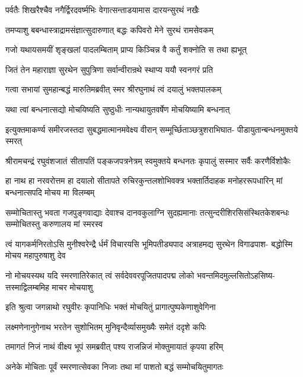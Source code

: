 \twolineshloka
{पर्वतैः शिखरैश्चैव नगैर्द्विरदवर्ष्मभिः}
{वेगात्सन्ताडयामास दारयन्सुरथं नखैः}%

\twolineshloka
{तमप्याशु बबन्धास्त्राद्रामसंज्ञात्सुदारुणात्}
{बद्धः कपिवरो मेने सुरथं रामसेवकम्}%

\twolineshloka
{गजो यथायसमयीं शृङ्खलां पादलम्बिताम्}
{प्राप्य किञ्चिन्न वै कर्तुं शक्नोति स तथा ह्यभूत्}%

\twolineshloka
{जितं तेन महाराज्ञा सुरथेन सुपुत्रिणा}
{सर्वान्वीरान्रथे स्थाप्य ययौ स्वनगरं प्रति}%

\twolineshloka
{गत्वा सभायां सुमहान्बद्धं मारुतिमब्रवीत्}
{स्मर श्रीरघुनाथं त्वं दयालुं भक्तपालकम्}%

\twolineshloka
{यथा त्वां बन्धनात्सद्यो मोचयिष्यति सुष्ठुधीः}
{नान्यथायुतवर्षेण मोचयिष्यामि बन्धनात्}%

\fourlineindentedshloka
{इत्युक्तमाकर्ण्य समीरजस्तदा}
{सुबद्धमात्मानमवेक्ष्य वीरान्}
{सम्मूर्च्छिताञ्छत्रुशराभिघात-}
{पीडायुतान्बन्धनमुक्तये स्मरत्}%

\twolineshloka
{श्रीरामचन्द्रं रघुवंशजातं सीतापतिं पङ्कजपत्रनेत्रम्}
{स्वमुक्तये बन्धनतः कृपालुं सस्मार सर्वैः करणैर्विशोकैः}%


\fourlineindentedshloka
{हा नाथ हा नरवरोत्तम हा दयालो}
{सीतापते रुचिरकुन्तलशोभिवक्त्र}
{भक्तार्तिदाहक मनोहररूपधारिन्}
{मां बन्धनात्सपदि मोचय मा विलम्बम्}%

\fourlineindentedshloka
{सम्मोचितास्तु भवता गजपुङ्गवाद्याः}
{देवाश्च दानवकुलाग्नि सुदह्यमानाः}
{तत्सुन्दरीशिरसिसंस्थितकेशबन्धः}
{सम्मोचितस्तु करुणालय मां स्मरस्व}%

\fourlineindentedshloka
{त्वं यागकर्मनिरतोऽसि मुनीश्वरेन्द्रै}
{र्धर्मं विचारयसि भूमिपतीड्यपाद}
{अत्राहमद्य सुरथेन विगाढपाश-}
{बद्धोस्मि मोचय महापुरुषाशु देव}%

\fourlineindentedshloka
{नो मोचयस्यथ यदि स्मरणातिरेकात्}
{त्वं सर्वदेववरपूजितपादपद्म}
{लोको भवन्तमिदमुल्लसितोऽहसिष्य-}
{त्तस्माद्विलम्बमिह माचर मोचयाशु}%

\twolineshloka
{इति श्रुत्वा जगन्नाथो रघुवीरः कृपानिधिः}
{भक्तं मोचयितुं प्रागात्पुष्पकेणाशुवेगिना}%

\twolineshloka
{लक्ष्मणेनानुगेनाथ भरतेन सुशोभितम्}
{मुनिवृन्दैर्व्यासमुख्यैः समेतं ददृशे कपिः}%

\twolineshloka
{तमागतं निजं नाथं वीक्ष्य भूपं समब्रवीत्}
{पश्य राजन्निजं मोक्तुमायातं कृपया हरिम्}%

\twolineshloka
{अनेके मोचिताः पूर्वं स्मरणात्सेवका निजाः}
{तथा मां पाशतो बद्धं सम्मोचयितुमागतः}%


